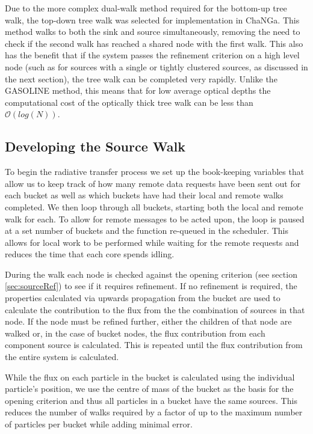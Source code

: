 Due to the more complex dual-walk method required for the bottom-up tree walk, the top-down tree walk was selected for implementation in ChaNGa. This method walks to both the sink and source simultaneously, removing the need to check if the second walk has reached a shared node with the first walk. This also has the benefit that if the system passes the refinement criterion on a high level node (such as for sources with a single or tightly clustered sources, as discussed in the next section), the tree walk can be completed very rapidly. Unlike the GASOLINE method, this means that for low average optical depths the computational cost of the optically thick tree walk can be less than $\mathcal{O}(log(N))$.

\subsection{Developing the Source Walk}

To begin the radiative transfer process we set up the book-keeping variables that allow us to keep track of how many remote data requests have been sent out for each bucket as well as which buckets have had their local and remote walks completed. We then loop through all buckets, starting both the local and remote walk for each. To allow for remote messages to be acted upon, the loop is paused at a set number of buckets and the function re-queued in the scheduler. This allows for local work to be performed while waiting for the remote requests and reduces the time that each core spends idling.

During the walk each node is checked against the opening criterion (see section \ref{sec:sourceRef}) to see if it requires refinement. If no refinement is required, the properties calculated via upwards propagation from the bucket are used to calculate the contribution to the flux from the the combination of sources in that node. If the node must be refined further, either the children of that node are walked or, in the case of bucket nodes, the flux contribution from each component source is calculated. This is repeated until the flux contribution from the entire system is calculated.

While the flux on each particle in the bucket is calculated using the individual particle's position, we use the centre of mass of the bucket as the basis for the opening criterion and thus all particles in a bucket have the same sources. This reduces the number of walks required by a factor of up to the maximum number of particles per bucket while adding minimal error.

